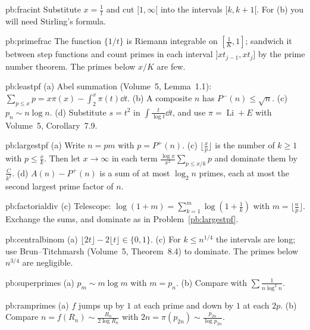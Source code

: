 \begin{hint}{pb:fracint}
Substitute $x=\frac1t$ and cut $[1,\infty[$ into the intervals $[k,k+1[$. For (b) you will need Stirling's formula.
\end{hint}

\begin{hint}{pb:primefrac}
The function $\{1/t\}$ is Riemann integrable on $[\frac1K,1]$; sandwich it between step functions and count primes in each interval
$]xt_{j-1},xt_j]$ by the prime number theorem. The primes below $x/K$ are few.
\end{hint}

\begin{hint}{pb:leastpf}
(a) Abel summation (Volume~5, Lemma~1.1): $\sum_{p\le x}p=x\pi(x)-\int_2^x\pi(t)\dd t$. (b) A composite $n$ has $P^-(n)\le\sqrt n$. (c) $p_n\sim n\log n$. (d) Substitute $s=t^2$ in
$\int\frac t{\log t}\dd t$, and use $\pi=\operatorname{Li}+E$ with Volume~5, Corollary~7.9.
\end{hint}

\begin{hint}{pb:largestpf}
(a) Write $n=pm$ with $p=P^+(n)$. (c) $\lfloor\frac xp\rfloor$ is the number of $k\ge1$ with $p\le\frac xk$. Then let $x\to\infty$ in each term $\frac{\log x}{x^2}\sum_{p\le x/k}p$ and dominate them by $\frac C{k^2}$.
(d) $A(n)-P^+(n)$ is a sum of at most $\log_2n$ primes, each at most the second largest prime factor of $n$.
\end{hint}

\begin{hint}{pb:factorialdiv}
(c) Telescope: $\log(1+m)=\sum_{k=1}^m\log(1+\frac1k)$ with $m=\lfloor\frac np\rfloor$. Exchange the sums, and dominate as in Problem~\ref{pb:largestpf}.
\end{hint}

\begin{hint}{pb:centralbinom}
(a) $\lfloor2t\rfloor-2\lfloor t\rfloor\in\{0,1\}$. (c) For $k\le n^{1/4}$ the intervals are long; use Brun--Titchmarsh (Volume~5, Theorem~8.4) to dominate. The primes below
$n^{3/4}$ are negligible.
\end{hint}

\begin{hint}{pb:superprimes}
(a) $p_m\sim m\log m$ with $m=p_n$. (b) Compare with $\sum\frac1{n\log^2n}$.
\end{hint}

\begin{hint}{pb:ramprimes}
(a) $f$ jumps up by $1$ at each prime and down by $1$ at each $2p$. (b) Compare $n=f(R_n)\sim\frac{R_n}{2\log R_n}$ with $2n=\pi(p_{2n})\sim\frac{p_{2n}}{\log p_{2n}}$.
\end{hint}

